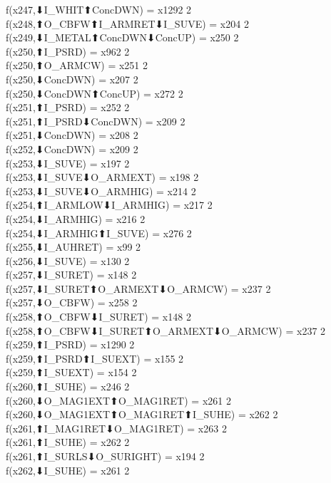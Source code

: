 f(x247,⬇I_WHIT⬆ConcDWN) = x1292 {2} \\
f(x248,⬆O_CBFW⬆I_ARMRET⬇I_SUVE) = x204 {2} \\
f(x249,⬇I_METAL⬆ConcDWN⬇ConcUP) = x250 {2} \\
f(x250,⬆I_PSRD) = x962 {2} \\
f(x250,⬆O_ARMCW) = x251 {2} \\
f(x250,⬇ConcDWN) = x207 {2} \\
f(x250,⬇ConcDWN⬆ConcUP) = x272 {2} \\
f(x251,⬆I_PSRD) = x252 {2} \\
f(x251,⬆I_PSRD⬇ConcDWN) = x209 {2} \\
f(x251,⬇ConcDWN) = x208 {2} \\
f(x252,⬇ConcDWN) = x209 {2} \\
f(x253,⬇I_SUVE) = x197 {2} \\
f(x253,⬇I_SUVE⬇O_ARMEXT) = x198 {2} \\
f(x253,⬇I_SUVE⬇O_ARMHIG) = x214 {2} \\
f(x254,⬆I_ARMLOW⬇I_ARMHIG) = x217 {2} \\
f(x254,⬇I_ARMHIG) = x216 {2} \\
f(x254,⬇I_ARMHIG⬆I_SUVE) = x276 {2} \\
f(x255,⬇I_AUHRET) = x99 {2} \\
f(x256,⬇I_SUVE) = x130 {2} \\
f(x257,⬇I_SURET) = x148 {2} \\
f(x257,⬇I_SURET⬆O_ARMEXT⬇O_ARMCW) = x237 {2} \\
f(x257,⬇O_CBFW) = x258 {2} \\
f(x258,⬆O_CBFW⬇I_SURET) = x148 {2} \\
f(x258,⬆O_CBFW⬇I_SURET⬆O_ARMEXT⬇O_ARMCW) = x237 {2} \\
f(x259,⬆I_PSRD) = x1290 {2} \\
f(x259,⬆I_PSRD⬆I_SUEXT) = x155 {2} \\
f(x259,⬆I_SUEXT) = x154 {2} \\
f(x260,⬆I_SUHE) = x246 {2} \\
f(x260,⬇O_MAG1EXT⬆O_MAG1RET) = x261 {2} \\
f(x260,⬇O_MAG1EXT⬆O_MAG1RET⬆I_SUHE) = x262 {2} \\
f(x261,⬆I_MAG1RET⬇O_MAG1RET) = x263 {2} \\
f(x261,⬆I_SUHE) = x262 {2} \\
f(x261,⬆I_SURLS⬇O_SURIGHT) = x194 {2} \\
f(x262,⬇I_SUHE) = x261 {2} \\
